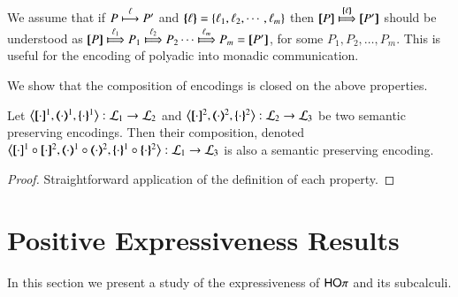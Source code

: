 \begin{remark}\label{r:multilabels}
We  assume that if 
$P \stackrel{\ell}{\longmapsto} P'$ and $\{\!\!\{\ell\}\!\!\} = \{\ell_1, \ell_2,  \cdots, \ell_m\}$ then
$\map{P} \Hby{\mapa{\ell}} \map{P'}$
should be understood as
$\map{P} \Hby{\ell_1} P_1 \Hby{\ell_2} P_2 \cdots \Hby{\ell_m} P_m =  \map{P'}$,
for some
$P_1, P_2, \ldots, P_m$.
This is useful for the encoding of polyadic into monadic communication.
\end{remark}

We show that the composition of encodings is closed on the above properties.

\begin{proposition}
	Let 
	$\enco{\map{\cdot}^{1}, \mapt{\cdot}^{1}, \mapa{\cdot}^{1}}: \tyl{L}_1 \to \tyl{L}_2$
	and 
	$\enco{\map{\cdot}^{2}, \mapt{\cdot}^{2}, \mapa{\cdot}^{2}}: \tyl{L}_2 \to \tyl{L}_3$
	be two semantic preserving encodings.
	Then their composition, denoted 
	$\enco{\map{\cdot}^{1} \circ \map{\cdot}^{2}, \mapt{\cdot}^{1} \circ \mapt{\cdot}^{2}, \mapa{\cdot}^{1}\circ \mapa{\cdot}^{2}}: \tyl{L}_1 \to \tyl{L}_3$
	is also a semantic preserving encoding.
\end{proposition}

\begin{proof}
	Straightforward application of the definition of each property.
\end{proof}

\section{Positive Expressiveness Results}
In this section we present a study of the expressiveness of $\mathsf{HO}\pi$ and its subcalculi. 


